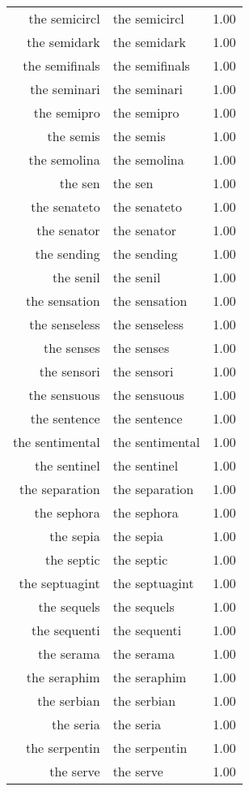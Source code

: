 \begin{table}[ht]
\begin{tabular}{rlr}
  the semicircl & the semicircl & 1.00 \\ 
  the semidark & the semidark & 1.00 \\ 
  the semifinals & the semifinals & 1.00 \\ 
  the seminari & the seminari & 1.00 \\ 
  the semipro & the semipro & 1.00 \\ 
  the semis & the semis & 1.00 \\ 
  the semolina & the semolina & 1.00 \\ 
  the sen & the sen & 1.00 \\ 
  the senateto & the senateto & 1.00 \\ 
  the senator & the senator & 1.00 \\ 
  the sending & the sending & 1.00 \\ 
  the senil & the senil & 1.00 \\ 
  the sensation & the sensation & 1.00 \\ 
  the senseless & the senseless & 1.00 \\ 
  the senses & the senses & 1.00 \\ 
  the sensori & the sensori & 1.00 \\ 
  the sensuous & the sensuous & 1.00 \\ 
  the sentence & the sentence & 1.00 \\ 
  the sentimental & the sentimental & 1.00 \\ 
  the sentinel & the sentinel & 1.00 \\ 
  the separation & the separation & 1.00 \\ 
  the sephora & the sephora & 1.00 \\ 
  the sepia & the sepia & 1.00 \\ 
  the septic & the septic & 1.00 \\ 
  the septuagint & the septuagint & 1.00 \\ 
  the sequels & the sequels & 1.00 \\ 
  the sequenti & the sequenti & 1.00 \\ 
  the serama & the serama & 1.00 \\ 
  the seraphim & the seraphim & 1.00 \\ 
  the serbian & the serbian & 1.00 \\ 
  the seria & the seria & 1.00 \\ 
  the serpentin & the serpentin & 1.00 \\ 
  the serve & the serve & 1.00 \\ 

\end{tabular}
\end{table}
